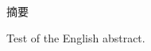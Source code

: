 
\begin{cabstract}
	摘要
\end{cabstract}

\begin{eabstract}
	Test of the English abstract.
\end{eabstract}


